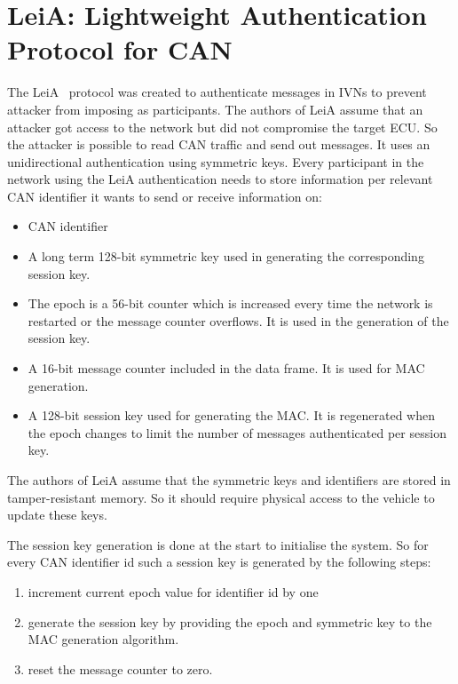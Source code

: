 


\section{LeiA: Lightweight Authentication Protocol for CAN}\label{subsec:leia}

The LeiA~\cite{Radu2016} protocol was created to authenticate messages in IVNs
to prevent attacker from imposing as participants. The authors of LeiA assume
that an attacker got access to the network but did not compromise the target
ECU\@. So the attacker is possible to read CAN traffic and send out messages. It
uses an unidirectional authentication using symmetric keys. Every participant in
the network using the LeiA authentication needs to store information per
relevant CAN identifier it wants to send or receive information on:

\begin{itemize}
    \item CAN identifier
    \item A long term 128-bit symmetric key used in generating the corresponding
    session key.
    \item The epoch is a 56-bit counter which is increased every time the
    network is restarted or the message counter overflows. It is used in the
    generation of the session key.
    \item A 16-bit message counter included in the data frame. It is used for
    MAC generation.
    \item A 128-bit session key used for generating the MAC. It is regenerated
    when the epoch changes to limit the number of messages authenticated per
    session key.
\end{itemize}

The authors of LeiA assume that the symmetric keys and identifiers are stored in
tamper-resistant memory. So it should require physical access to the vehicle to
update these keys.

The session key generation is done at the start to initialise the system. So for
every CAN identifier id such a session key is generated by the following steps:

\begin{enumerate}
    \item increment current epoch value for identifier id by one
    \item generate the session key by providing the epoch and symmetric key to
    the MAC generation algorithm.
    \item reset the message counter to zero.
\end{enumerate}

